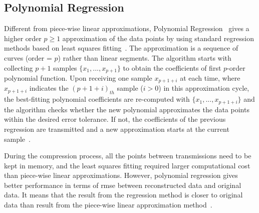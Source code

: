 \subsection{Polynomial Regression}
\label{sec:polynomial}

Different from piece-wise linear approximations, Polynomial
Regression~\cite{zordan2014performance} gives a higher order $p \geqslant1$
approximation of the data points by using standard regression methods based on
least squares fitting~\cite{phillips2003interpolation}. The approximation is a
sequence of curves (order = $p$) rather than linear segments. The algorithm
starts with collecting $p+1$ samples $\{x_1, ..., x_{p+1} \}$ to obtain the
coefficients of first $p$-order polynomial function. Upon receiving one sample
$x_{p+1+i}$ at each time, where $x_{p+1+i}$ indicates the $(p+1+i)_{th}$ sample
($i>0$) in this approximation cycle, the best-fitting polynomial coefficients
are re-computed with $\{ x_1, ..., x_{p+1+i}\}$ and the algorithm checks whether
the new polynomial approximates the data points within the desired error
tolerance. If not, the coefficients of the previous regression are transmitted
and a new approximation starts at the current
sample~\cite{zordan2014performance}.

During the compression process, all the points between transmissions need to be
kept in memory, and the least squares fitting required larger computational cost
than piece-wise linear approximations. However, polynomial regression gives
better performance in terms of \acrfull{rmse} between reconstructed data and
original data. It means that the result from the regression method is closer to
original data than result from the piece-wise linear approximation
method~\cite{zordan2014performance}.



